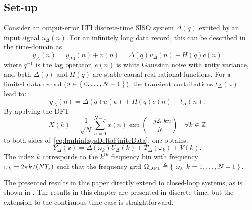 \subsection{Set-up}
Consider an output-error \gls{LTI} discrete-time \gls{SISO} system $\Delta(q)$ excited by an input signal $u_{\Delta}(n)$.
For an infinitely long data record, this can be described in the time-domain as
\begin{equation}
  y_{\Delta}(n) 
    = 
      y_{\Delta0}(n)
      + v(n) 
    = 
      \Delta(q)u_{\Delta}(n) 
      + H(q)e(n)
  \label{eq:lrmhinf:sysDeltaInfData}
\end{equation}
where $q^{-1}$ is the lag operator, $e(n)$ is white Gaussian noise with unity variance, and both $\Delta(q)$ and $H(q)$ are stable causal real-rational functions.
For a limited data record ($n \in \Set{0,\ldots,N-1}$), the transient contributions $t_{\Delta}(n)$ lead to:
\begin{equation}
    y_{\Delta}(n) 
      = 
        \Delta(q)u(n) 
        + H(q)e(n) 
        + t_{\Delta}(n)
    \text{.}
    \label{eq:lrmhinf:sysDeltaFiniteData}
\end{equation}
By applying the \gls{DFT}
\begin{equation}
  X(k) 
       = 
         \frac{1}
              {\sqrt{N}} 
         \sum_{n=0}^{N-1} 
            x(n) \exp \left( \frac{- j 2 \pi k n }{N} \right)
         \quad   
         \forall k \in \mathbb{Z}
  \label{eq:lrmhinf:DFT}
\end{equation} 
to both sides of~\eqref{eq:lrmhinf:sysDeltaFiniteData}, one obtains:
\begin{equation}
  Y_{\Delta}(k) 
                = 
                  \Delta(\omega_k) U_{\Delta}(k) 
                  + T_{\Delta}(\omega_k) 
                  + V(k) 
  \text{.}
  \label{eq:lrmhinf:sysDeltaFiniteDataFD}
\end{equation}
The index $k$ corresponds to the $k^{\text{th}}$ frequency bin with frequency $\omega_{k} = 2\pi k / (N T_{\mathrm{s}})$ such that the frequency grid $\Omega_{\mathrm{DFT}} \triangleq \Set{\left.\omega_k \right| k = 1,\ldots,N-1}$.

The presented results in this paper directly extend to closed-loop systems, as is shown in .
The results in this chapter are presented in discrete time, but the extension to the continuous time case is straightforward.

